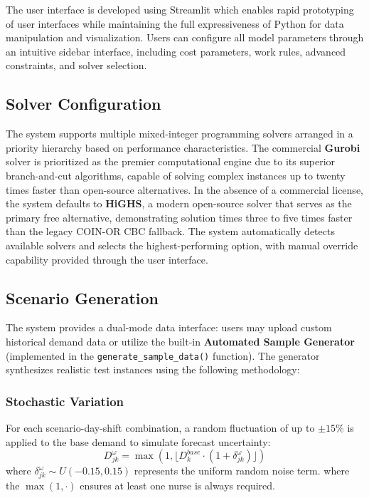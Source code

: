 \documentclass[10pt,a4paper,twocolumn]{article}
\begin{document}
The user interface is developed using Streamlit which enables rapid prototyping of user interfaces while maintaining the full expressiveness of Python for data manipulation and visualization. Users can configure all model parameters through an intuitive sidebar interface, including cost parameters, work rules, advanced constraints, and solver selection.

\subsection{Solver Configuration}

The system supports multiple mixed-integer programming solvers arranged in a priority hierarchy based on performance characteristics. The commercial \textbf{Gurobi} solver is prioritized as the premier computational engine due to its superior branch-and-cut algorithms, capable of solving complex instances up to twenty times faster than open-source alternatives. In the absence of a commercial license, the system defaults to \textbf{HiGHS}, a modern open-source solver that serves as the primary free alternative, demonstrating solution times three to five times faster than the legacy COIN-OR CBC fallback. The system automatically detects available solvers and selects the highest-performing option, with manual override capability provided through the user interface.


\subsection{Scenario Generation}
The system provides a dual-mode data interface: users may upload custom historical demand data or utilize the built-in \textbf{Automated Sample Generator} (implemented in the \texttt{generate\_sample\_data()} function). The generator synthesizes realistic test instances using the following methodology:
\subsubsection{Stochastic Variation}
For each scenario-day-shift combination, a random fluctuation of up to $\pm 15\%$ is applied to the base demand to simulate forecast uncertainty:
\begin{equation}
D_{jk}^{\omega} = \max(1, \lfloor D_{k}^{base} \cdot (1 + \delta_{jk}^{\omega}) \rfloor)
\end{equation}
where $\delta_{jk}^{\omega} \sim U(-0.15, 0.15)$ represents the uniform random noise term.
where the $\max(1, \cdot)$ ensures at least one nurse is always required.
\end{document}
